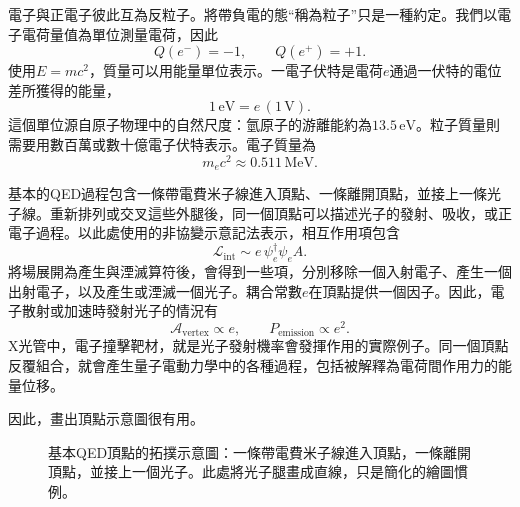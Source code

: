 電子與正電子彼此互為反粒子。將帶負電的態``稱為粒子''只是一種約定。我們以電子電荷量值為單位測量電荷，因此
\begin{equation}
Q(e^-)=-1,\qquad Q(e^+)=+1.
\end{equation}
使用\(E=mc^2\)，質量可以用能量單位表示。一電子伏特是電荷\(e\)通過一伏特的電位差所獲得的能量，
\begin{equation}
1\,\mathrm{eV}=e\,(1\,\mathrm V).
\end{equation}
這個單位源自原子物理中的自然尺度：氫原子的游離能約為\(13.5\,\mathrm{eV}\)。粒子質量則需要用數百萬或數十億電子伏特表示。電子質量為
\begin{equation}
m_e c^2 \approx 0.511\,\mathrm{MeV}.
\end{equation}

\begin{classroomqa}
\end{classroomqa}

基本的QED過程包含一條帶電費米子線進入頂點、一條離開頂點，並接上一條光子線。重新排列或交叉這些外腿後，同一個頂點可以描述光子的發射、吸收，或正電子過程。以此處使用的非協變示意記法表示，相互作用項包含
\begin{equation}
\mathcal{L}_{\mathrm{int}}\sim e\,\psi_e^\dagger \psi_e A.
\end{equation}
將場展開為產生與湮滅算符後，會得到一些項，分別移除一個入射電子、產生一個出射電子，以及產生或湮滅一個光子。耦合常數\(e\)在頂點提供一個因子。因此，電子散射或加速時發射光子的情況有
\begin{equation}
\mathcal{A}_{\mathrm{vertex}}\propto e,
\qquad
P_{\mathrm{emission}}\propto e^2.
\end{equation}
X光管中，電子撞擊靶材，就是光子發射機率會發揮作用的實際例子。同一個頂點反覆組合，就會產生量子電動力學中的各種過程，包括被解釋為電荷間作用力的能量位移。

因此，畫出頂點示意圖很有用。

\begin{figure}[h]
\centering
{}
\caption{基本QED頂點的拓撲示意圖：一條帶電費米子線進入頂點，一條離開頂點，並接上一個光子。此處將光子腿畫成直線，只是簡化的繪圖慣例。}
\end{figure}

